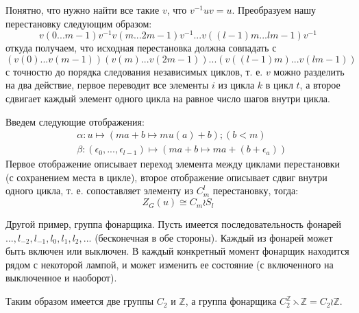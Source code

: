Понятно, что нужно найти все такие $v$, что $v^{-1}uv = u$. Преобразуем нашу перестановку следующим образом:
\[
	v\left(0 ... m-1\right)v^{-1}v\left(m ... 2m-1\right)v^{-1} ... v\left(\left(l-1\right)m ... lm-1\right)v^{-1}
\]
откуда получаем, что исходная перестановка должна совпадать с
\[
	\left(v\left(0\right) ... v\left(m-1\right)\right)\left(v\left(m\right) ... v\left(2m-1\right)\right) ... \left(v\left(\left(l-1\right)m\right) ... v\left(lm-1\right)\right)
\]
с точностю до порядка следования независимых циклов, т. е. $v$ можно разделить на два действие, первое переводит все элементы $i$ из цикла $k$ в цикл $t$, а второе сдвигает каждый элемент одного цикла на равное число шагов внутри цикла.

Введем следующие отображения:
\[
	\begin{split}
		& \alpha : u \mapsto \left(ma + b \mapsto mu\left(a\right) + b\right); \left(b < m\right) \\
		& \beta : \left(\epsilon_0, ..., \epsilon_{l-1}\right) \mapsto \left(ma + b \mapsto ma + \left(b + \epsilon_a\right)\right)
	\end{split}
\]
Первое отображение описывает переход элемента между циклами перестановки (с сохранением места в цикле), второе отображение описывает сдвиг внутри одного цикла, т. е. сопоставляет элементу из $C_m^l$ перестановку, тогда:
\[
	Z_G\left(u\right) \cong C_m \wr S_l
\]

Другой пример, группа фонарщика. Пусть имеется последовательность фонарей $..., l_{-2}, l_{-1}, l_0, l_1, l_2, ...$ (бесконечная в обе стороны). Каждый из фонарей может быть включен или выключен. В каждый конкретный момент фонарщик находится рядом с некоторой лампой, и может изменить ее состояние (с включенного на выключенное и наоборот).

Таким образом имеется две группы $C_2$ и $\mathbb{Z}$, а группа фонарщика $C_2^{\mathbb{Z}} \leftthreetimes \mathbb{Z} = C_2 \wr \mathbb{Z}$.
